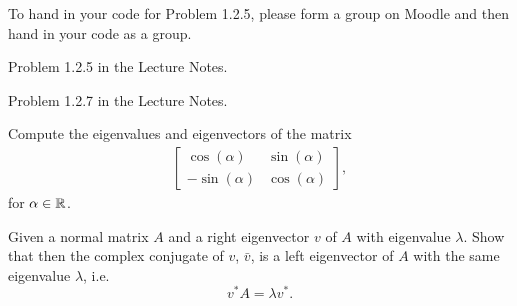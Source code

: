 
\begin{Sheet}
  \label{sheet2}
	
	To hand in your code for Problem 1.2.5, please form a group on Moodle and then hand in your code as a group.

			
  \begin{Problem}
  	Problem 1.2.5 in the Lecture Notes.
  \end{Problem}

  \begin{Problem}
	Problem 1.2.7 in the Lecture Notes.
  \end{Problem}

  \begin{Problem}
	Compute the eigenvalues and eigenvectors of the matrix
	\begin{gather*}
	\begin{bmatrix}
	\cos(\alpha) & \sin(\alpha) \\
	-\sin(\alpha) & \cos(\alpha)
	\end{bmatrix},
	\end{gather*}
	for $\alpha\in\mathbb R$.
  \end{Problem}

  \begin{Problem}
  	Given a normal matrix $A$ and a right eigenvector $v$ of $A$ with eigenvalue $\lambda$.
  	Show that then the complex conjugate of $v$, $\bar{v}$, is a left eigenvector of $A$ with the same eigenvalue $\lambda$, i.e.
  	\begin{equation*}
  	v^{\ast} A = \lambda v^{\ast}.
  	\end{equation*}
  \end{Problem}


\end{Sheet}

